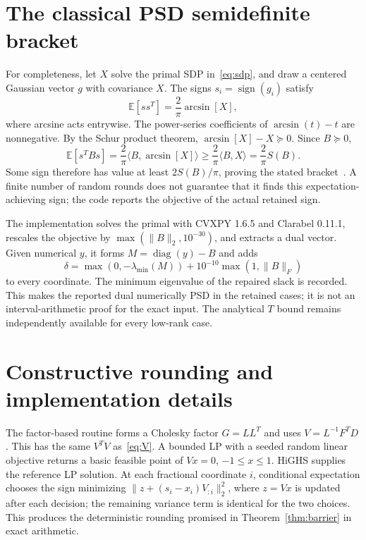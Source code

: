 \documentclass[11pt]{article}
\theoremstyle{definition}\newtheorem{definition}[theorem]{Definition}
\newcommand{\diag}{\operatorname{diag}}
\newcommand{\sgn}{\operatorname{sign}}
\begin{document}
\appendix
\section{The classical PSD semidefinite bracket}\label{app:sdp}
For completeness, let $X$ solve the primal SDP in~\eqref{eq:sdp}, and draw a centered Gaussian vector $g$ with covariance $X$. The signs $s_i=\sgn(g_i)$ satisfy
\begin{equation}
 \mathbb E[ss^T]=\frac2\pi\arcsin[X],
\end{equation}
where arcsine acts entrywise. The power-series coefficients of $\arcsin(t)-t$ are nonnegative. By the Schur product theorem, $\arcsin[X]-X\succeq0$. Since $B\succeq0$,
\begin{equation}
 \mathbb E[s^TBs]=\frac2\pi\langle B,\arcsin[X]\rangle
 \ge\frac2\pi\langle B,X\rangle=\frac2\pi S(B).
\end{equation}
Some sign therefore has value at least $2S(B)/\pi$, proving the stated bracket~\cite{nesterov}. A finite number of random rounds does not guarantee that it finds this expectation-achieving sign; the code reports the objective of the actual retained sign.

The implementation solves the primal with CVXPY 1.6.5 and Clarabel 0.11.1, rescales the objective by $\max(\|B\|_2,10^{-30})$, and extracts a dual vector. Given numerical $y$, it forms $M=\diag(y)-B$ and adds
\begin{equation}
 \delta=\max(0,-\lambda_{\min}(M))+10^{-10}\max(1,\|B\|_F)
\end{equation}
to every coordinate. The minimum eigenvalue of the repaired slack is recorded. This makes the reported dual numerically PSD in the retained cases; it is not an interval-arithmetic proof for the exact input. The analytical $T$ bound remains independently available for every low-rank case.

\section{Constructive rounding and implementation details}
The factor-based routine forms a Cholesky factor $G=LL^T$ and uses $V=L^{-1}F^TD$. This has the same $V^TV$ as~\eqref{eq:V}. A bounded LP with a seeded random linear objective returns a basic feasible point of $Vx=0$, $-1\le x\le1$. HiGHS supplies the reference LP solution. At each fractional coordinate $i$, conditional expectation chooses the sign minimizing
$\|z+(s_i-x_i)V_{:i}\|_2^2$, where $z=Vx$ is updated after each decision; the remaining variance term is identical for the two choices. This produces the deterministic rounding promised in Theorem~\ref{thm:barrier} in exact arithmetic.
\end{document}
